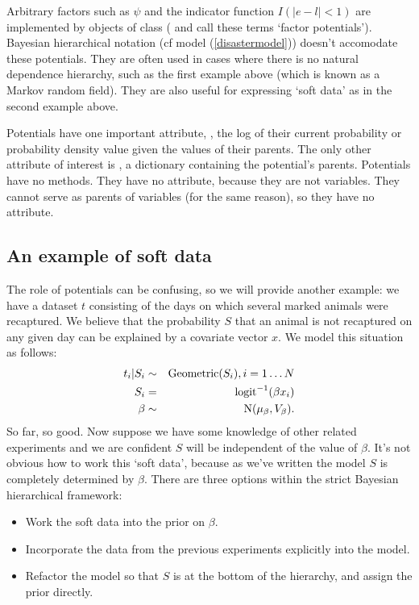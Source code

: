 \documentclass[]{jss}
\begin{document}
Arbitrary factors such as $\psi$ and the indicator function $I(|e-l|<1)$ are
implemented by objects of class  (\citet{dawidmarkov} and
\citet{Jordan:2004p5439} call these terms `factor potentials'). Bayesian
hierarchical notation (cf model (\ref{disastermodel})) doesn't accomodate these
potentials. They are often used in cases where there is no natural dependence
hierarchy, such as the first example above (which is known as a Markov random
field). They are also useful for expressing `soft data'
\citep{Christakos:2002p5506} as in the second example above.


\bigskip
Potentials have one important attribute, , the log of their current probability or probability density value given the values of their parents. The only other attribute of interest is , a dictionary containing the potential's parents. Potentials have no methods. They have no  attribute, because they are not variables. They cannot serve as parents of variables (for the same reason), so they have no  attribute.

\subsection{An example of soft data}
The role of potentials can be confusing, so we will provide another example: we have a dataset $t$ consisting of the days on which several marked animals were recaptured. We believe that the probability $S$ that an animal is not recaptured on any given day can be explained by a covariate vector $x$. We model this situation as follows:
\begin{eqnarray*}
    t_i|S_i &\sim& \textup{Geometric}(S_i), i=1\ldots N\\
    S_i &=& \textup{logit}^{-1}(\beta x_i)\\
    \beta &\sim& \textup{N}(\mu_\beta, V_\beta).
\end{eqnarray*}
So far, so good. Now suppose we have some knowledge of other related experiments and we are confident $S$ will be independent of the value of $\beta$. It's not obvious how to work this `soft data', because as we've written the model $S$ is completely determined by $\beta$. There are three options within the strict Bayesian hierarchical framework:
\begin{itemize}
    \item Work the soft data into the prior on $\beta$.
    \item Incorporate the data from the previous experiments explicitly into the model.
    \item Refactor the model so that $S$ is at the bottom of the hierarchy, and assign the prior directly.
\end{itemize}
\end{document}
